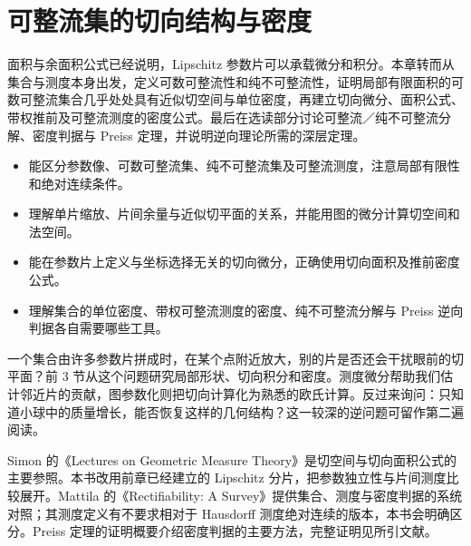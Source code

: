 \chapter{可整流集的切向结构与密度}
\label{b1:ch:19}%
\begin{chapterabstract}
面积与余面积公式已经说明，Lipschitz 参数片可以承载微分和积分。本章转而从集合与测度本身出发，定义可数可整流性和纯不可整流性，证明局部有限面积的可数可整流集合几乎处处具有近似切空间与单位密度，再建立切向微分、面积公式、带权推前及可整流测度的密度公式。最后在选读部分讨论可整流／纯不可整流分解、密度判据与 Preiss 定理，并说明逆向理论所需的深层定理。
\end{chapterabstract}

\begin{learninggoals}
\begin{itemize}
\item\label{b1:item:ch19-goal-rectifiable}能区分参数像、可数可整流集、纯不可整流集及可整流测度，注意局部有限性和绝对连续条件。
\item\label{b1:item:ch19-goal-tangent}理解单片缩放、片间余量与近似切平面的关系，并能用图的微分计算切空间和法空间。
\item\label{b1:item:ch19-goal-area}能在参数片上定义与坐标选择无关的切向微分，正确使用切向面积及推前密度公式。
\item\label{b1:item:ch19-goal-density}理解集合的单位密度、带权可整流测度的密度、纯不可整流分解与 Preiss 逆向判据各自需要哪些工具。
\end{itemize}
\end{learninggoals}

一个集合由许多参数片拼成时，在某个点附近放大，别的片是否还会干扰眼前的切平面？前 3 节从这个问题研究局部形状、切向积分和密度。测度微分帮助我们估计邻近片的贡献，图参数化则把切向计算化为熟悉的欧氏计算。反过来询问：只知道小球中的质量增长，能否恢复这样的几何结构？这一较深的逆问题可留作第二遍阅读。

\ProseParagraphBreak

Simon 的《Lectures on Geometric Measure Theory》\cite[\S\S11--12]{Simon1983Lectures}是切空间与切向面积公式的主要参照。本书改用前章已经建立的 Lipschitz 分片，把参数独立性与片间测度比较展开。Mattila 的《Rectifiability: A Survey》\cite{Mattila2023Rectifiability}提供集合、测度与密度判据的系统对照；其测度定义有不要求相对于 Hausdorff 测度绝对连续的版本，本书会明确区分。Preiss 定理的证明概要介绍密度判据的主要方法，完整证明见所引文献。

